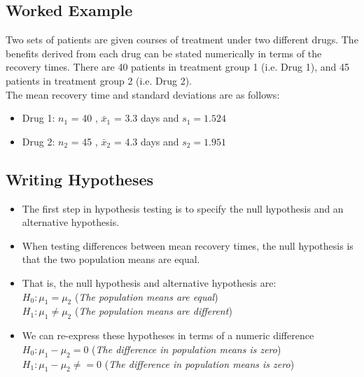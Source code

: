 \documentclass[a4paper,12pt]{article}
\begin{document}
\large 
\subsection*{Worked Example}
Two sets of patients are given courses of treatment under two different drugs. The benefits
derived from each drug can be stated numerically in terms of the recovery times. There are 40 patients in treatment group 1 (i.e. Drug 1), and 45 patients in treatment group 2 (i.e. Drug 2). \\
\medskip
The mean recovery time and standard deviations are as follows:
\begin{itemize}
\item Drug 1:  $n_1$ = 40 , $\bar{x}_1$ = 3.3 days and $s_1 = 1.524$
\item Drug 2:  $n_2$ = 45 , $\bar{x}_2$ = 4.3 days and $s_2 = 1.951 $
\end{itemize}
\medskip


\subsection*{Writing Hypotheses }
\begin{itemize}
\item The first step in hypothesis testing is to specify the null hypothesis and an alternative hypothesis.
\item When testing differences between mean recovery times, the null hypothesis is that the two population means are equal.
\item That is, the null hypothesis and alternative hypothesis are:\\
$H_0: \mu_1 = \mu_2$ \qquad (\textit{The population means are equal})\\
$H_1: \mu_1 \neq \mu_2$  \qquad (\textit{The population means are different})
\item We can re-express these hypotheses in terms of a numeric difference\\
$H_0: \mu_1 - \mu_2 = 0$ \qquad (\textit{The difference in population means is zero})\\
$H_1: \mu_1  - \mu_2  \neq = 0 $  \qquad (\textit{The difference in population means is zero})
\end{itemize}
\end{document}
